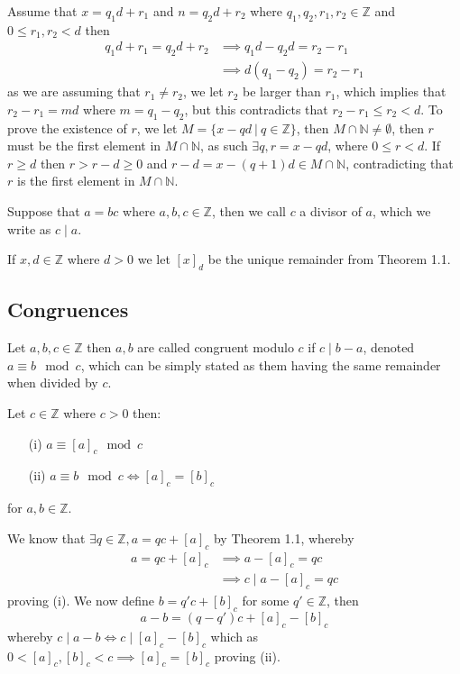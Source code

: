 \begin{prf}
    Assume that $x=q_{1}d+r_{1}$ and $n=q_{2}d+r_{2}$ where $q_{1},q_{2},r_{1},r_{2}\in\mathbb{Z}$ and $0\leq r_{1},r_{2}<d$ then
    \begin{align*}
        q_{1}d+r_{1}=q_{2}d+r_{2}&\implies q_{1}d-q_{2}d=r_{2}-r_{1} \\
                     &\implies d(q_{1}-q_{2})=r_{2}-r_{1}
    \end{align*}
    as we are assuming that $r_{1}\neq r_{2}$, we let $r_{2}$ be larger than $r_{1}$, which implies that $r_{2}-r_{1}=md$ where $m=q_{1}-q_{2}$, but this contradicts that $r_{2}-r_{1}\leq r_{2}<d$. To prove the existence of $r$, we let $M=\{x-qd~|~q\in\mathbb{Z}\}$, then $M\cap\mathbb{N}\neq\emptyset$, then $r$ must be the first element in $M\cap\mathbb{N}$, as such $\exists q,r=x-qd$, where $0\leq r<d$. If $r\geq d$ then $r>r-d\geq 0$ and $r-d=x-(q+1)d\in M\cap\mathbb{N}$, contradicting that $r$ is the first element in $M\cap\mathbb{N}$.
\end{prf}
\begin{defi}[Divisor]
    Suppose that $a=bc$ where $a,b,c\in\mathbb{Z}$, then we call $c$
    a divisor of $a$, which we write as $c\mid a$.
\end{defi}
\begin{defi}[Remainder]
    If $x,d\in\mathbb{Z}$ where $d>0$ we let $[x]_{d}$ be the unique remainder from Theorem 1.1.
\end{defi}
\pagebreak\subsection{Congruences}
\begin{defi}[Congruence]
    Let $a,b,c\in\mathbb{Z}$ then $a,b$ are called congruent modulo $c$ if $c\mid b-a$, denoted $a\equiv b\mod c$, which can be simply stated as them having the same remainder when divided by $c$.
\end{defi}
\begin{prop}[Congruence]
    Let $c\in\mathbb{Z}$ where $c>0$ then:
    \begin{itemize}
        \item[(i)] $a\equiv[a]_{c}\mod c$
        \item[(ii)] $a\equiv b\mod c\iff[a]_{c}=[b]_{c}$
    \end{itemize}
    for $a,b\in\mathbb{Z}$.
\end{prop}
\begin{prf}
    We know that $\exists q\in\mathbb{Z},a=qc+[a]_{c}$ by Theorem 1.1, whereby
    \begin{align*}
        a=qc+[a]_{c}&\implies a-[a]_{c}=qc \\
                    &\implies c\mid a-[a]_{c}=qc
    \end{align*}
    proving (i). We now define $b=q'c+[b]_{c}$ for some $q'\in\mathbb{Z}$, then
    \[
        a-b=(q-q')c+[a]_{c}-[b]_{c}
    \]
    whereby $c\mid a-b\iff c\mid[a]_{c}-[b]_{c}$ which as $0<[a]_{c},[b]_{c}<c\implies[a]_{c}=[b]_{c}$ proving (ii).
\end{prf}
